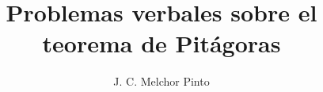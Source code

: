 \documentclass[12pt]{guia}
\title{Problemas verbales sobre el teorema de Pitágoras}
\author{J. C. Melchor Pinto}
\begin{document}
\pagestyle{headandfoot}
\addpoints
\INFO
\vspace{-0.5cm}
\begin{multicols}{2}
    
    
    \columnbreak
    
\end{multicols}
\begin{questions}
    \questionboxed[10]{}
    \questionboxed[10]{}
    \questionboxed[10]{}
    \questionboxed[10]{}
    \questionboxed[10]{}
    \questionboxed[10]{}
    \questionboxed[10]{}
    \questionboxed[10]{}
    \questionboxed[10]{}
    \questionboxed[10]{}
\end{questions}
\end{document}
